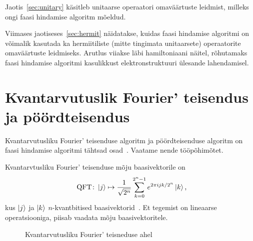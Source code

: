 \documentclass[12pt]{report}
\def\ket#1{\mathinner{|#1\rangle}}
\def\QFT{\mathop{\mathrm{QFT}}\nolimits}
\begin{document}
Jaotis~\ref{sec:unitary} käsitleb unitaarse operaatori omaväärtuste leidmist, milleks ongi faasi hindamise algoritm mõeldud.

Viimases jaotiseses~\ref{sec:hermit} näidatakse, kuidas faasi hindamise algoritmi on võimalik kasutada ka hermiitiliste (mitte tingimata unitaarsete) operaatorite omaväärtuste leidmiseks.
Arutlus viiakse läbi hamiltoniaani näitel, rõhutamaks faasi hindamise algoritmi kasulikkust elektronstruktuuri ülesande lahendamisel.

\section{Kvantarvutuslik Fourier' teisendus ja pöördteisendus}\label{sec:qft}

Kvantarvutusliku Fourier' teisenduse algoritm ja pöördteisenduse algoritm on faasi hindamise algoritmi tähtsad osad~\cite{nielsen+chuang, kaye+laflamme+mosca}.
Vaatame nende tööpõhimõtet.

Kvantarvtusliku Fourier' teisenduse mõju baasivektorile on
\begin{align}\label{f:qftdef}
    \QFT\colon
    \ket{j} \mapsto \frac{1}{\sqrt{2^n}} \sum_{k=0}^{2^n-1} e^{2\pi ijk/2^n} \ket{k} \rlap{,}
\end{align}
kus \(\ket{j}\) ja \(\ket{k}\) \(n\)-kvantbitised baasivektorid~\cite{nielsen+chuang, kaye+laflamme+mosca}.
Et tegemist on lineaarse operatsiooniga, piisab vaadata mõju baasivektoritele.

\begin{figure}
    \centering
    \caption{Kvantarvutusliku Fourier' teisneduse ahel~\cite{nielsen+chuang, kaye+laflamme+mosca}}
    \label{fig:qft}
\end{figure}
\end{document}
